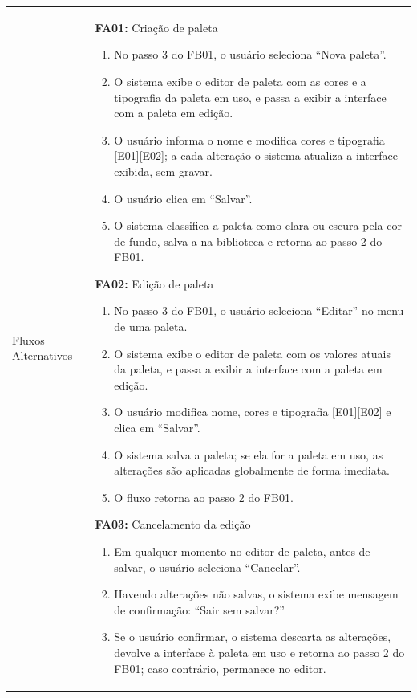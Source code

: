 \begin{longtable}{ >{\raggedright}p{2.8cm} | >{\raggedright\arraybackslash}p{10.7cm} }
Fluxos Alternativos & \mbox{}
\textbf{FA01:} Criação de paleta
\vspace{2pt}
\begin{enumerate}[nosep,leftmargin=1.2em,topsep=0pt,partopsep=0pt,parsep=0pt,itemsep=0pt,after=\vspace{2pt}]
    \item No passo 3 do FB01, o usuário seleciona ``Nova paleta''.
    \item O sistema exibe o editor de paleta com as cores e a tipografia da paleta em uso, e passa a exibir a interface com a paleta em edição.
    \item O usuário informa o nome e modifica cores e tipografia [E01][E02]; a cada alteração o sistema atualiza a interface exibida, sem gravar.
    \item O usuário clica em ``Salvar''.
    \item O sistema classifica a paleta como clara ou escura pela cor de fundo, salva-a na biblioteca e retorna ao passo 2 do FB01.
\end{enumerate}

\textbf{FA02:} Edição de paleta
\vspace{2pt}
\begin{enumerate}[nosep,leftmargin=1.2em,topsep=0pt,partopsep=0pt,parsep=0pt,itemsep=0pt,after=\vspace{2pt}]
    \item No passo 3 do FB01, o usuário seleciona ``Editar'' no menu de uma paleta.
    \item O sistema exibe o editor de paleta com os valores atuais da paleta, e passa a exibir a interface com a paleta em edição.
    \item O usuário modifica nome, cores e tipografia [E01][E02] e clica em ``Salvar''.
    \item O sistema salva a paleta; se ela for a paleta em uso, as alterações são aplicadas globalmente de forma imediata.
    \item O fluxo retorna ao passo 2 do FB01.
\end{enumerate}

\textbf{FA03:} Cancelamento da edição
\vspace{2pt}
\begin{enumerate}[nosep,leftmargin=1.2em,topsep=0pt,partopsep=0pt,parsep=0pt,itemsep=0pt,after=\vspace{2pt}]
    \item Em qualquer momento no editor de paleta, antes de salvar, o usuário seleciona ``Cancelar''.
    \item Havendo alterações não salvas, o sistema exibe mensagem de confirmação: ``Sair sem salvar?''
    \item Se o usuário confirmar, o sistema descarta as alterações, devolve a interface à paleta em uso e retorna ao passo 2 do FB01; caso contrário, permanece no editor.
\end{enumerate}


\end{longtable}
